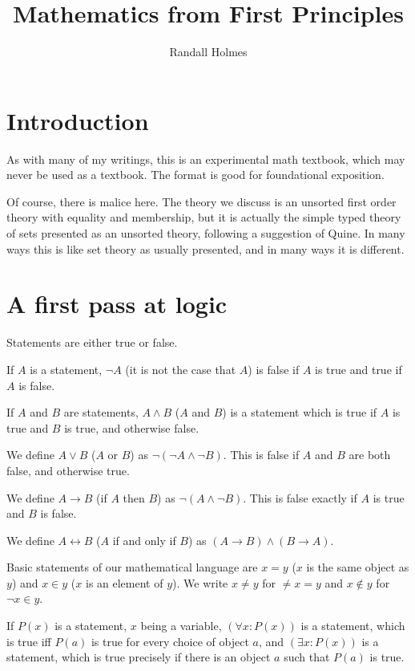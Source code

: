 \documentclass[12pt]{article}
\title{Mathematics from First Principles}
\author{Randall Holmes}
\begin{document}
\maketitle

\tableofcontents

\newpage

\section{Introduction}

As with many of my writings, this is an experimental math textbook, which may never be used as a textbook.  The format is good for foundational exposition.

Of course, there is malice here.  The theory we discuss is an unsorted first order theory with equality and membership, but it is actually the simple typed theory of sets presented as an unsorted theory, following a suggestion of Quine.  In many ways this is like set theory as usually presented, and in many ways it is different.

\newpage

\section{A first pass at logic}

Statements are either true or false.

If $A$ is a statement, $\neg A$ (it is not the case that $A$) is false if $A$ is true and true if $A$ is false.

If $A$ and $B$ are statements, $A \wedge B$ ($A$ and $B$)  is a statement which is true if $A$ is true and $B$ is true, and otherwise false.

We define $A \vee B$ ($A$ or $B$) as $\neg(\neg A \wedge \neg B)$.  This is false if $A$ and $B$ are both false, and otherwise true.

We define $A \rightarrow B$ (if $A$ then $B$) as $\neg(A \wedge \neg B)$.  This is false exactly if $A$ is true and $B$ is false.

We define $A \leftrightarrow B$ ($A$ if and only if $B$) as $(A \rightarrow B) \wedge (B \rightarrow A)$.

Basic statements of our mathematical language are $x=y$ ($x$ is the same object as $y$) and $x \in y$ ($x$ is an element of $y$).  We write $x \neq y$ for
$\neq x=y$ and $x \not\in y$ for $\neg x \in y$.

If $P(x)$ is a statement, $x$ being a variable, $(\forall x:P(x))$ is a statement, which is true iff $P(a)$ is true for every choice of object $a$,
and $(\exists x:P(x))$ is a statement, which is true precisely if there is an object $a$ such that $P(a)$ is true.
\end{document}
